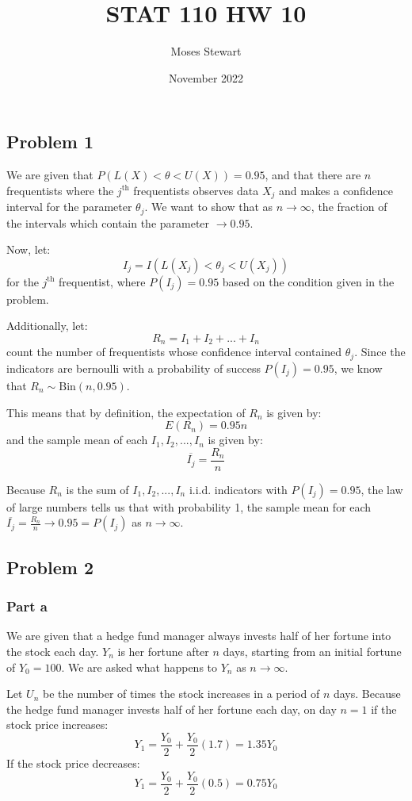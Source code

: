 \documentclass{article}
\title{STAT 110 HW 10}
\author{Moses Stewart}
\date{November 2022}
\begin{document}
\maketitle

\subsection{Problem 1}
We are given that $P(L(X) < \theta < U(X)) = 0.95$, and that there are $n$ frequentists where the $j^{\text{th}}$ frequentists observes data $X_{j}$ and makes a confidence interval for the parameter $\theta_{j}$. We want to show that as $n \rightarrow \infty$, the fraction of the intervals which contain the parameter $\rightarrow 0.95$.

Now, let:
$$I_{j} = I(L(X_{j}) < \theta_{j} < U(X_{j}))$$
for the $j^{\text{th}}$ frequentist, where $P(I_{j}) = 0.95$ based on the condition given in the problem.

Additionally, let:
$$R_{n} = I_{1} + I_{2} + ... + I_{n}$$
count the number of frequentists whose confidence interval contained $\theta_{j}$. Since the indicators are bernoulli with a probability of success $P(I_{j}) = 0.95$, we know that $R_{n} \sim \text{Bin}(n, 0.95)$.

This means that by definition, the expectation of $R_{n}$ is given by:
$$E(R_{n}) = 0.95n$$
and the sample mean of each $I_{1}, I_{2}, ..., I_{n}$ is given by:
$$\overline{I_{j}} = \frac{R_{n}}{n}$$
 
Because $R_{n}$ is the sum of $I_{1}, I_{2}, ..., I_{n}$ i.i.d. indicators with $P(I_{j}) = 0.95$, the law of large numbers tells us that with probability 1, the sample mean for each $\overline{I_{j}} = \frac{R_{n}}{n} \rightarrow 0.95 = P(I_{j})$ as $n \rightarrow \infty$.

\subsection{Problem 2}
\subsubsection{Part a}
We are given that a hedge fund manager always invests half of her fortune into the stock each day. $Y_{n}$ is her fortune after $n$ days, starting from an initial fortune of $Y_{0} = 100$. We are asked what happens to $Y_{n}$ as $n \rightarrow \infty$.

Let $U_{n}$ be the number of times the stock increases in a period of $n$ days. Because the hedge fund manager invests half of her fortune each day, on day $n = 1$ if the stock price increases:
$$Y_{1} = \frac{Y_{0}}{2} + \frac{Y_{0}}{2}(1.7) = 1.35Y_{0}$$
If the stock price decreases:
$$Y_{1} = \frac{Y_{0}}{2} + \frac{Y_{0}}{2}(0.5) = 0.75Y_{0}$$
\end{document}
